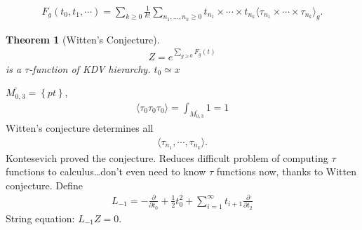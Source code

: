 \documentclass[12pt,reqno]{amsart}
\numberwithin{equation}{section}  %
\newcommand{\p}{\partial}
\newtheorem{theorem}{Theorem}[section]
\begin{document}
  \begin{gather*}
    F_{g}(t_{0}, t_{1}, \cdots) = \sum_{k \ge 0} \frac{1}{k!} \sum_{n_{1}, \ldots,
    n_{k} \ge 0} t_{n_{1}} \times\cdots\times t_{n_{k}} \langle \tau_{n_{1}}
    \times\cdots \times \tau_{n_{k}} \rangle_{g}.
  \end{gather*}
%
%
%
%
%                
%
%
%
%
  \begin{theorem}[Witten's Conjecture]
    \begin{gather*}
      Z = e^{\sum_{g \ge 0} F_{g}(t)}
    \end{gather*}
    is a $\tau$-function of KDV hierarchy. $t_{0} \simeq x$
    \label{thm:witt}
  \end{theorem}
%
%
  $\bar{M_{0,3}} = \left\{ pt \right\}$, 
  \begin{gather*}
    \langle \tau_{0} \tau_{0} \tau_{0} \rangle  = \int_{\bar{M_{0,3}}} 1 =1
  \end{gather*}
  Witten's conjecture determines all
  \begin{gather*}
    \langle \tau_{n_{1}}, \cdots, \tau_{n_{k}} \rangle. 
  \end{gather*}
  Kontesevich proved the conjecture. Reduces difficult problem of computing $\tau$
  functions to calculus\ldots don't even need to know $\tau$ functions now, thanks
  to Witten conjecture. Define
  \begin{gather*}
    L_{-1} = -\frac{\p}{\p t_{0}} + \frac{1}{2} t_{0}^{2} + \sum_{i=1}^{\infty}
    t_{i+1} \frac{\p}{\p t_{2}}
  \end{gather*}
  String equation: $L_{-1} Z = 0$.
\end{document}
